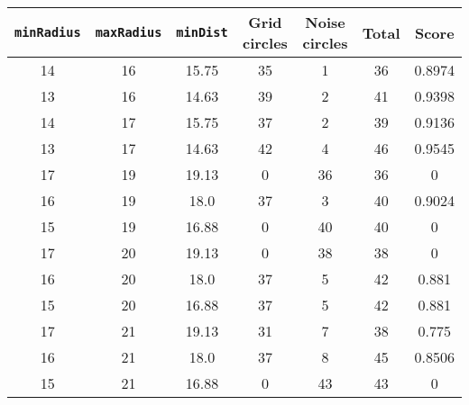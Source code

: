 \documentclass[letterpaper, 12pt]{article}
\begin{document}
\begin{longtable}{|c|c|c|c|c|c|c|}
\hline
\textbf{\texttt{minRadius}} & \textbf{\texttt{maxRadius}} & \textbf{\texttt{minDist}} & \textbf{Grid circles} & \textbf{Noise circles} & \textbf{Total} & \textbf{Score} \\
\hline
14 & 16 & 15.75 & 35 & 1 & 36 & 0.8974 \\
\hline
13 & 16 & 14.63 & 39 & 2 & 41 & 0.9398 \\
\hline
14 & 17 & 15.75 & 37 & 2 & 39 & 0.9136 \\
\hline
13 & 17 & 14.63 & 42 & 4 & 46 & 0.9545 \\
\hline
17 & 19 & 19.13 & 0 & 36 & 36 & 0 \\
\hline
16 & 19 & 18.0 & 37 & 3 & 40 & 0.9024 \\
\hline
15 & 19 & 16.88 & 0 & 40 & 40 & 0 \\
\hline
17 & 20 & 19.13 & 0 & 38 & 38 & 0 \\
\hline
16 & 20 & 18.0 & 37 & 5 & 42 & 0.881 \\
\hline
15 & 20 & 16.88 & 37 & 5 & 42 & 0.881 \\
\hline
17 & 21 & 19.13 & 31 & 7 & 38 & 0.775 \\
\hline
16 & 21 & 18.0 & 37 & 8 & 45 & 0.8506 \\
\hline
15 & 21 & 16.88 & 0 & 43 & 43 & 0 \\
\hline
\end{longtable}
\end{document}
